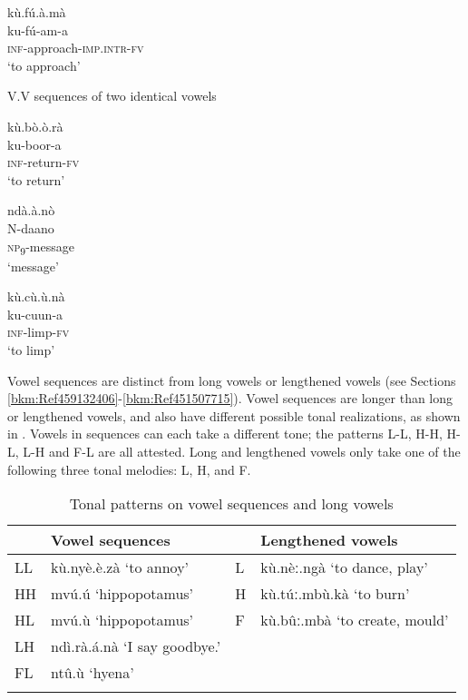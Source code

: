 \ex
\glll kù.fú.à.mà\\
ku-fú-am-a\\
\textsc{inf}-approach-\textsc{imp}.\textsc{intr}-\textsc{fv}\\
\glt ‘to approach’
\z\z

\ea
\label{bkm:Ref489365100}
  V.V sequences of two identical vowels

\ea
\glll kù.bò.ò.rà\\
ku-boor-a\\
\textsc{inf}-return-\textsc{fv}\\
\glt ‘to return’

\ex
\glll ndà.à.nò\\
N-daano\\
\textsc{np}\textsubscript{9}-message\\
\glt ‘message’

\ex
\glll kù.cù.ù.nà\\
ku-cuun-a\\
\textsc{inf}-limp-\textsc{fv}\\
\glt ‘to limp’
\z\z

Vowel sequences are distinct from long vowels or lengthened vo\-wels (see Sections \ref{bkm:Ref459132406}-\ref{bkm:Ref451507715}). Vowel sequences are longer than long or lengthened vowels, and also have different possible tonal realizations, as shown in . Vowels in sequences can each take a different tone; the patterns L-L, H-H, H-L, L-H and F-L are all attested. Long and lengthened vowels only take one of the following three tonal melodies: L, H, and F.

\begin{table}
\label{bkm:Ref98925329}\caption{\label{tab:2:2}Tonal patterns on vowel sequences and long vowels}

\begin{tabular}{llll}
\lsptoprule
& Vowel sequences &  & Lengthened vowels\\
\midrule
LL & kù.nyè.è.zà ‘to annoy’ & L & kù.nèː.ngà ‘to dance, play’\\
HH & mvú.ú ‘hippopotamus’ & H & kù.túː.mbù.kà ‘to burn’\\
HL & mvú.ù ‘hippopotamus’ & F & kù.bûː.mbà ‘to create, mould’\\
LH & ndì.rà.á.nà ‘I say goodbye.’ &  & \\
FL & ntû.ù ‘hyena’ &  & \\
\lspbottomrule
\end{tabular}
\end{table}

